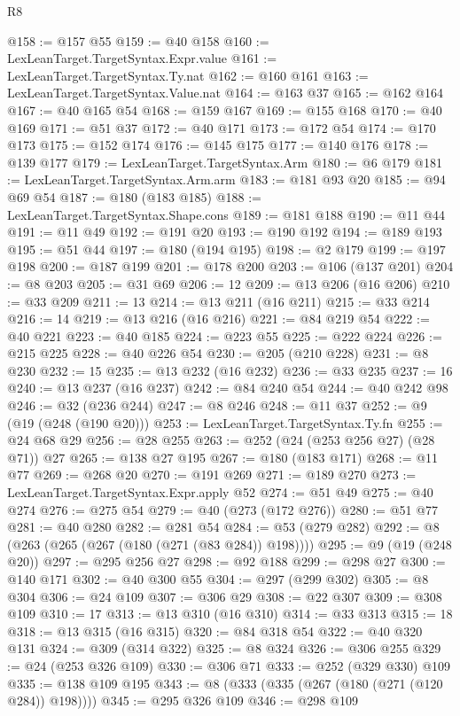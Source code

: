 \begin{lexlean}{R8}
\begin{coremodule}
@158 := @157 @55
@159 := @40 @158
@160 := LexLeanTarget.TargetSyntax.Expr.value
@161 := LexLeanTarget.TargetSyntax.Ty.nat
@162 := @160 @161
@163 := LexLeanTarget.TargetSyntax.Value.nat
@164 := @163 @37
@165 := @162 @164
@167 := @40 @165 @54
@168 := @159 @167
@169 := @155 @168
@170 := @40 @169
@171 := @51 @37
@172 := @40 @171
@173 := @172 @54
@174 := @170 @173
@175 := @152 @174
@176 := @145 @175
@177 := @140 @176
@178 := @139 @177
@179 := LexLeanTarget.TargetSyntax.Arm
@180 := @6 @179
@181 := LexLeanTarget.TargetSyntax.Arm.arm
@183 := @181 @93 @20
@185 := @94 @69 @54
@187 := @180 (@183 @185)
@188 := LexLeanTarget.TargetSyntax.Shape.cons
@189 := @181 @188
@190 := @11 @44
@191 := @11 @49
@192 := @191 @20
@193 := @190 @192
@194 := @189 @193
@195 := @51 @44
@197 := @180 (@194 @195)
@198 := @2 @179
@199 := @197 @198
@200 := @187 @199
@201 := @178 @200
@203 := @106 (@137 @201)
@204 := @8 @203
@205 := @31 @69
@206 := 12
@209 := @13 @206 (@16 @206)
@210 := @33 @209
@211 := 13
@214 := @13 @211 (@16 @211)
@215 := @33 @214
@216 := 14
@219 := @13 @216 (@16 @216)
@221 := @84 @219 @54
@222 := @40 @221
@223 := @40 @185
@224 := @223 @55
@225 := @222 @224
@226 := @215 @225
@228 := @40 @226 @54
@230 := @205 (@210 @228)
@231 := @8 @230
@232 := 15
@235 := @13 @232 (@16 @232)
@236 := @33 @235
@237 := 16
@240 := @13 @237 (@16 @237)
@242 := @84 @240 @54
@244 := @40 @242 @98
@246 := @32 (@236 @244)
@247 := @8 @246
@248 := @11 @37
@252 := @9 (@19 (@248 (@190 @20)))
@253 := LexLeanTarget.TargetSyntax.Ty.fn
@255 := @24 @68 @29
@256 := @28 @255
@263 := @252 (@24 (@253 @256 @27) (@28 @71)) @27
@265 := @138 @27 @195
@267 := @180 (@183 @171)
@268 := @11 @77
@269 := @268 @20
@270 := @191 @269
@271 := @189 @270
@273 := LexLeanTarget.TargetSyntax.Expr.apply @52
@274 := @51 @49
@275 := @40 @274
@276 := @275 @54
@279 := @40 (@273 (@172 @276))
@280 := @51 @77
@281 := @40 @280
@282 := @281 @54
@284 := @53 (@279 @282)
@292 := @8 (@263 (@265 (@267 (@180 (@271 (@83 @284)) @198))))
@295 := @9 (@19 (@248 @20))
@297 := @295 @256 @27
@298 := @92 @188
@299 := @298 @27
@300 := @140 @171
@302 := @40 @300 @55
@304 := @297 (@299 @302)
@305 := @8 @304
@306 := @24 @109
@307 := @306 @29
@308 := @22 @307
@309 := @308 @109
@310 := 17
@313 := @13 @310 (@16 @310)
@314 := @33 @313
@315 := 18
@318 := @13 @315 (@16 @315)
@320 := @84 @318 @54
@322 := @40 @320 @131
@324 := @309 (@314 @322)
@325 := @8 @324
@326 := @306 @255
@329 := @24 (@253 @326 @109)
@330 := @306 @71
@333 := @252 (@329 @330) @109
@335 := @138 @109 @195
@343 := @8 (@333 (@335 (@267 (@180 (@271 (@120 @284)) @198))))
@345 := @295 @326 @109
@346 := @298 @109

\end{coremodule}
\end{lexlean}
